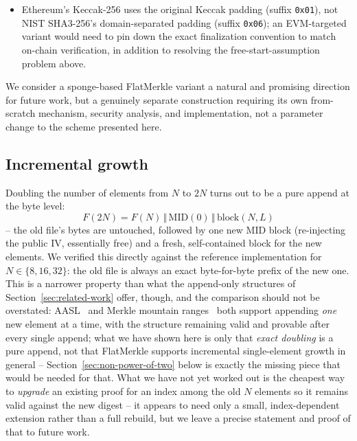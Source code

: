 \begin{itemize}
  substitute $P$ for $\C$ and inherit Section~\ref{sec:security}'s security
  argument; it would need a fundamentally different re-injection mechanism
  -- one that does not hand an adversary this redundant rate/message
  freedom, e.g.\ re-injecting only squeezed output through the rate
  portion while the capacity is never adversarially set and the rate is
  never simultaneously free on both sides of a single absorb call -- and a
  correspondingly different security assumption and proof, not merely
  ``its own independent justification'' for the same one.
\item Ethereum's Keccak-256 uses the original Keccak padding (suffix
  \texttt{0x01}), not NIST SHA3-256's domain-separated padding (suffix
  \texttt{0x06}); an EVM-targeted variant would need to pin down the exact
  finalization convention to match on-chain verification, in addition to
  resolving the free-start-assumption problem above.
\end{itemize}

We consider a sponge-based FlatMerkle variant a natural and promising
direction for future work, but a genuinely separate construction requiring
its own from-scratch mechanism, security analysis, and implementation, not
a parameter change to the scheme presented here.

\subsection{Incremental growth}

Doubling the number of elements from $N$ to $2N$ turns out to be a pure
append at the byte level:
\begin{equation}
F(2N) = F(N) \,\Vert\, \mathrm{MID}(0) \,\Vert\, \mathrm{block}(N, L)
\end{equation}
-- the old file's bytes are untouched, followed by one new $\mathrm{MID}$
block (re-injecting the public $\mathrm{IV}$, essentially free) and a
fresh, self-contained block for the new elements. We verified this
directly against the reference implementation for $N \in \{8,16,32\}$: the
old file is always an exact byte-for-byte prefix of the new one. This is a
narrower property than what the append-only structures of
Section~\ref{sec:related-work} offer, though, and the comparison should not
be overstated: AASL~\citep{maniatis2003} and Merkle mountain
ranges~\citep{todd2016mmr} both support appending \emph{one} new element at
a time, with the structure remaining valid and provable after every single
append; what we have shown here is only that \emph{exact doubling} is a
pure append, not that FlatMerkle supports incremental single-element
growth in general -- Section~\ref{sec:non-power-of-two} below is exactly
the missing piece that would be needed for that. What we
have not yet worked out is the cheapest way to \emph{upgrade} an existing
proof for an index among the old $N$ elements so it remains valid against
the new digest -- it appears to need only a small, index-dependent
extension rather than a full rebuild, but we leave a precise statement and
proof of that to future work.

